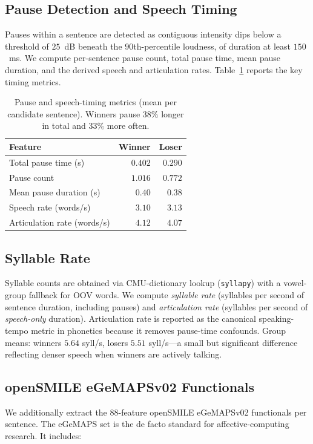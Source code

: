 \documentclass[journal]{IEEEtran}
\begin{document}
\subsection{Pause Detection and Speech Timing}
Pauses within a sentence are detected as contiguous intensity dips
below a threshold of $25$~dB beneath the $90$th-percentile loudness,
of duration at least $150$~ms. We compute per-sentence pause count,
total pause time, mean pause duration, and the derived speech and
articulation rates. Table~\ref{tab:pauses} reports the key timing
metrics.

\begin{table}[t]
\caption{Pause and speech-timing metrics (mean per candidate sentence).
Winners pause $38\%$ longer in total and $33\%$ more often.}
\label{tab:pauses}
\centering
\begin{tabular}{lrr}
\toprule
Feature                                & Winner & Loser \\
\midrule
Total pause time (s)                   & $0.402$ & $0.290$ \\
Pause count                            & $1.016$ & $0.772$ \\
Mean pause duration (s)                & $0.40$  & $0.38$ \\
Speech rate (words/s)                  & $3.10$  & $3.13$ \\
Articulation rate (words/s)            & $4.12$  & $4.07$ \\
\bottomrule
\end{tabular}
\end{table}

\subsection{Syllable Rate}
Syllable counts are obtained via CMU-dictionary lookup
(\texttt{syllapy}) with a vowel-group fallback for OOV words. We
compute \emph{syllable rate} (syllables per second of sentence
duration, including pauses) and \emph{articulation rate}
(syllables per second of \emph{speech-only} duration). Articulation
rate is reported as the canonical speaking-tempo metric in phonetics
because it removes pause-time confounds. Group means: winners
$5.64$ syll/s, losers $5.51$ syll/s---a small but significant
difference reflecting denser speech when winners are actively talking.

\subsection{openSMILE eGeMAPSv02 Functionals}
We additionally extract the $88$-feature openSMILE eGeMAPSv02
functionals \cite{eyben2016gemaps,eyben2010opensmile} per sentence.
The eGeMAPS set is the de facto standard for affective-computing
research. It includes:
\end{document}
